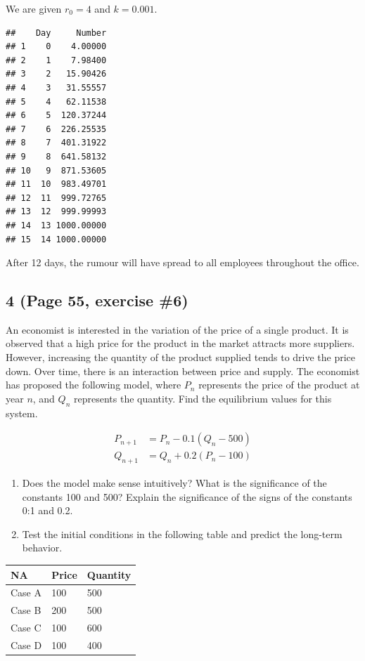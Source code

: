 \documentclass[]{article}
\begin{document}
We are given \(r_0 = 4\) and \(k = 0.001\).

\begin{verbatim}
##    Day     Number
## 1    0    4.00000
## 2    1    7.98400
## 3    2   15.90426
## 4    3   31.55557
## 5    4   62.11538
## 6    5  120.37244
## 7    6  226.25535
## 8    7  401.31922
## 9    8  641.58132
## 10   9  871.53605
## 11  10  983.49701
## 12  11  999.72765
## 13  12  999.99993
## 14  13 1000.00000
## 15  14 1000.00000
\end{verbatim}

After 12 days, the rumour will have spread to all employees throughout
the office.

\hypertarget{page-55-exercise-6}{%
\subsection{4 (Page 55, exercise \#6)}\label{page-55-exercise-6}}

An economist is interested in the variation of the price of a single
product. It is observed that a high price for the product in the market
attracts more suppliers. However, increasing the quantity of the product
supplied tends to drive the price down. Over time, there is an
interaction between price and supply. The economist has proposed the
following model, where \(P_n\) represents the price of the product at
year \(n\), and \(Q_n\) represents the quantity. Find the equilibrium
values for this system.

\begin{align*}
P_{n+1} &= P_n - 0.1(Q_n - 500) \\
Q_{n+1} &= Q_n + 0.2(P_n - 100)
\end{align*}

\begin{enumerate}
\def\labelenumi{\alph{enumi}.}
\item
  Does the model make sense intuitively? What is the significance of the
  constants 100 and 500? Explain the significance of the signs of the
  constants 0:1 and 0.2.
\item
  Test the initial conditions in the following table and predict the
  long-term behavior.
\end{enumerate}

\begin{longtable}[]{@{}lll@{}}
\toprule
NA & Price & Quantity\tabularnewline
\midrule
\endhead
Case A & 100 & 500\tabularnewline
Case B & 200 & 500\tabularnewline
Case C & 100 & 600\tabularnewline
Case D & 100 & 400\tabularnewline
\bottomrule
\end{longtable}
\end{document}
